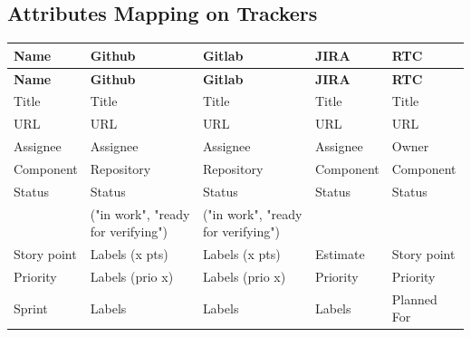 \subsection{Attributes Mapping on Trackers}

\begin{longtable}{|l|l|l|l|l|}
   \hline
   \textbf{Name} & \textbf{Github} & \textbf{Gitlab} & \textbf{JIRA} & \textbf{RTC} \\
   \hline
   \endfirsthead

   \hline
   \textbf{Name} & \textbf{Github} & \textbf{Gitlab} & \textbf{JIRA} & \textbf{RTC} \\
   \hline
   \endhead

   Title & Title & Title & Title & Title \\
   \hline
   URL & URL & URL & URL & URL \\
   \hline
   Assignee & Assignee & Assignee & Assignee & Owner \\
   \hline
   Component & Repository & Repository & Component & Component \\
   \hline
   Status & Status & Status & Status & Status \\
   & ("in work", "ready for verifying") & ("in work", "ready for verifying") & & \\
   \hline
   Story point & Labels (x pts) & Labels (x pts) & Estimate & Story point \\
   \hline
   Priority & Labels (prio x) & Labels (prio x) & Priority & Priority \\
   \hline
   Sprint & Labels & Labels & Labels & Planned For \\
   \hline
\end{longtable}